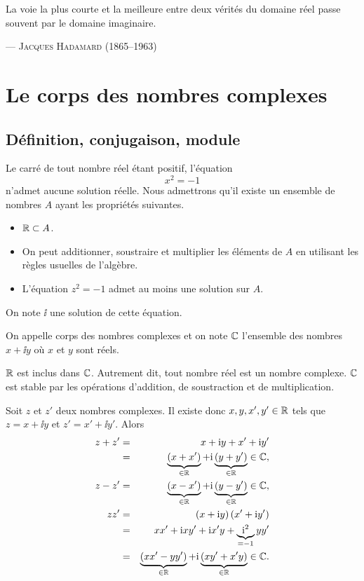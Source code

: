 \documentclass{magnolia}
\begin{document}
\setlength{}
\epigraph{\og La voie la plus courte et la meilleure entre deux vérités du domaine réel passe souvent par le domaine imaginaire. \fg}{--- \textsc{Jacques Hadamard (1865--1963)}}

\magtoc

\section{Le corps des nombres complexes}
\subsection{Définition, conjugaison, module}
Le carré de tout nombre réel étant positif, l'équation
$$x^2=-1$$
n'admet aucune solution réelle. Nous admettrons qu'il existe un ensemble de
nombres $A$ ayant les propriétés suivantes.
\begin{itemize}
  \item $\mathbb{R}\subset A$.
  \item On peut additionner, soustraire et multiplier les éléments de $A$ en
    utilisant les règles usuelles de l'algèbre.
  \item L'équation $z^2=-1$ admet au moins une solution sur $A$.
\end{itemize}
On note $\ii$ une solution de cette équation.

\begin{definition}[utile=-3]
  On appelle corps des nombres complexes et on note $\mathbb{C}$
  l'ensemble des nombres $x+\ii y$ où $x$ et $y$ sont réels.
\end{definition}

\begin{remarques}
\remarque $\mathbb{R}$ est inclus dans $\mathbb{C}$. Autrement dit, tout nombre réel est un nombre
  complexe.
\remarque $\mathbb{C}$ est stable par les opérations d'addition, de soustraction et
  de multiplication.
\begin{preuve}
Soit $z$ et $z'$ deux nombres complexes. Il existe donc
$x,y,x',y'\in\mathbb{R}$ tels que $z=x+\ii y$ et $z'=x'+\ii y'$. Alors
\begin{eqnarray*}
z+z' &=& x+{\rm i} y+x'+{\rm i} y'\\
     &=& \underbrace{\left(x+x'\right)}_{\in\mathbb{R}}
         +{\rm i} \underbrace{\left(y+y'\right)}_{\in\mathbb{R}}\in\mathbb{C},\\
z-z' &=& \underbrace{\left(x-x'\right)}_{\in\mathbb{R}}
         +{\rm i} \underbrace{\left(y-y'\right)}_{\in\mathbb{R}}\in\mathbb{C},\\
z z' &=& \left(x+{\rm i} y\right)\left(x'+{\rm i} y'\right)\\
     &=& x x'+{\rm i} x y'+{\rm i} x' y+\underbrace{{\rm i}^2}_{=-1} y y'\\
     &=& \underbrace{\left(x x'-y y'\right)}_{\in\mathbb{R}} +
         {\rm i}\underbrace{\left(x y'+x' y\right)}_{\in\mathbb{R}} \in\mathbb{C}.
\end{eqnarray*}
\end{preuve}
\end{remarques}
\end{document}
